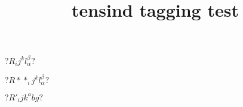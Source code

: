 \documentclass{article}
\title{tensind tagging test}
\begin{document}
$?R_ij^kl_\alpha^\beta?$

$?R**_ij^kl_\alpha^\beta?$


$?R'_ijk^abg?$
\end{document}
